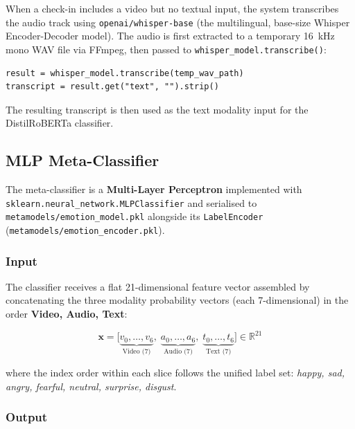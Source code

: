 \documentclass[12pt,a4paper]{article}
\begin{document}
When a check-in includes a video but no textual input, the system
transcribes the audio track using \texttt{openai/whisper-base} (the
multilingual, base-size Whisper Encoder-Decoder model). The audio is first
extracted to a temporary 16~kHz mono WAV file via FFmpeg, then passed to
\texttt{whisper\_model.transcribe()}:

\begin{lstlisting}[caption={Automatic transcription when text input is absent.}]
result = whisper_model.transcribe(temp_wav_path)
transcript = result.get("text", "").strip()
\end{lstlisting}

The resulting transcript is then used as the text modality input for the
DistilRoBERTa classifier.

\subsection{MLP Meta-Classifier}

The meta-classifier is a \textbf{Multi-Layer Perceptron} implemented with
\texttt{sklearn.neural\_network.MLPClassifier} and serialised to
\texttt{metamodels/emotion\_model.pkl} alongside its
\texttt{LabelEncoder} (\texttt{metamodels/emotion\_encoder.pkl}).

\subsubsection{Input}

The classifier receives a flat 21-dimensional feature vector assembled by
concatenating the three modality probability vectors (each 7-dimensional)
in the order \textbf{Video, Audio, Text}:

\begin{equation}
\mathbf{x} = \bigl[\underbrace{v_0, \ldots, v_6}_{\text{Video (7)}},\;
               \underbrace{a_0, \ldots, a_6}_{\text{Audio (7)}},\;
               \underbrace{t_0, \ldots, t_6}_{\text{Text (7)}}\bigr]
\in \mathbb{R}^{21}
\label{eq:featurevec}
\end{equation}

where the index order within each slice follows the unified label set:
\textit{happy, sad, angry, fearful, neutral, surprise, disgust}.

\subsubsection{Output}
\end{document}
